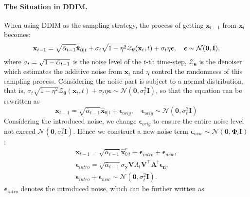 \documentclass{article} \usepackage{iclr2023_conference,times}
\begin{document}
\paragraph{The Situation in DDIM.}
When using DDIM as the sampling strategy, the process of getting $\mathbf{x}_{t-1}$ from $\mathbf{x}_{t}$ becomes:
\begin{equation}
    \mathbf{x}_{t-1} = \sqrt{\Bar{\alpha}_{t-1}}\mathbf{\hat{x}}_{0|t} + \sigma_{t}\sqrt{1-\eta^2}\mathcal{Z}_{\boldsymbol{\theta}}(\mathbf{x}_{t},t) + \sigma_{t}\eta\boldsymbol{\epsilon},\quad \boldsymbol{\epsilon}\sim\mathcal{N}(\mathbf{0}, \mathbf{I}),
\end{equation}
where $\sigma_{t}=\sqrt{1-\Bar{\alpha}_{t-1}}$ is the noise level of the $t$-th time-step, $\mathcal{Z}_{\boldsymbol{\theta}}$ is the denoiser which estimates the additive noise from $\mathbf{x}_t$ and $\eta$ control the randomness of this sampling process.
Considering the noise part is subject to a normal distribution, that is, $\sigma_{t}\sqrt{1-\eta^2}\mathcal{Z}_{\boldsymbol{\theta}}(\mathbf{x}_{t},t) + \sigma_{t}\eta\boldsymbol{\epsilon}\sim \mathcal{N}(\mathbf{0}, \sigma_{t}^2\mathbf{I})$, so that the equation can be rewritten as 
\begin{equation}
    \mathbf{x}_{t-1} = \sqrt{\bar{\alpha}_{t-1}}\mathbf{\hat{x}}_{0|t} + \boldsymbol{\epsilon}_{orig},\quad \boldsymbol{\epsilon}_{orig}\sim\mathcal{N}(\mathbf{0}, \sigma_{t}^2\mathbf{I})
\end{equation}
Considering the introduced noise, we change $\boldsymbol{\epsilon}_{orig}$ to ensure the entire noise level not exceed $\mathcal{N}(\mathbf{0}, \sigma_{t}^2\mathbf{I})$. Hence we construct a new noise term $\boldsymbol{\epsilon}_{new}\sim\mathcal{N}(\mathbf{0}, \mathbf{\Phi}_{t}\mathbf{I})$:
\begin{align}
    \mathbf{x}_{t-1} = \sqrt{\bar{\alpha}_{t-1}}\mathbf{\hat{x}}_{0|t}^c + \boldsymbol{\epsilon}_{intro} +  \boldsymbol{\epsilon}_{new},\\
    \boldsymbol{\epsilon}_{intro} = \sqrt{\bar{\alpha}_{t-1}}\sigma_{\mathbf{y}}\mathbf{V}\Lambda_{t}\mathbf{V}^{\top}\mathbf{A}^{\dagger}\boldsymbol{\epsilon}_{\mathbf{n}},\\
    \boldsymbol{\epsilon}_{intro} +  \boldsymbol{\epsilon}_{new}\sim\mathcal{N}(\mathbf{0}, \sigma_{t}^2\mathbf{I}).
\end{align}
$\boldsymbol{\epsilon}_{intro}$ denotes the introduced noise, which can be further written as
\end{document}
